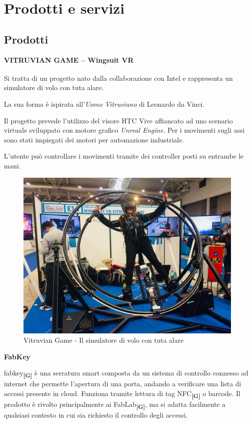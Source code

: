 \section{Prodotti e servizi}
\subsection{Prodotti}
\textbf{VITRUVIAN GAME – Wingsuit VR}

Si tratta di un progetto nato dalla collaborazione con Intel\textsuperscript{\textregistered} e rappresenta un simulatore di volo con tuta alare.

La sua forma è ispirata all'\textit{Uomo Vitruviano} di Leonardo da Vinci.

Il progetto prevede l'utilizzo del visore HTC Vive affiancato ad uno scenario virtuale sviluppato con motore grafico \textit{Unreal Engine}. Per i movimenti sugli assi sono stati impiegati dei motori per automazione industriale.

L'utente può controllare i movimenti tramite dei controller posti su entrambe le mani.

\begin{figure}[H]
	\begin{center}
	\includegraphics[scale=0.15]{immagini/vitruvian.jpg}
	\caption{Vitruvian Game - Il simulatore di volo con tuta alare}
	\end{center}
\end{figure}

\textbf{FabKey}

\gls{fabkey}\textbf{\textsubscript{[G]}} è una serratura smart composta da un sistema di controllo connesso ad internet che permette l'apertura di una porta, andando a verificare una lista di accessi presente in cloud. Funziona tramite lettura di tag \gls{NFC}\textbf{\textsubscript{[G]}} o barcode. Il prodotto è rivolto principalmente ai \gls{FabLab}\textbf{\textsubscript{[G]}}, ma si adatta facilmente a qualsiasi contesto in cui sia richiesto il controllo degli accessi.

